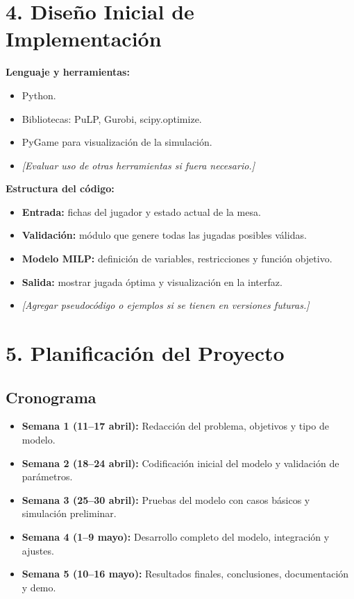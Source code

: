 \documentclass[12pt]{article}
\begin{document}
\section*{4. Diseño Inicial de Implementación}

\textbf{Lenguaje y herramientas:}
\begin{itemize}
    \item Python.
    \item Bibliotecas: PuLP, Gurobi, scipy.optimize.
    \item PyGame para visualización de la simulación.
    \item \textit{[Evaluar uso de otras herramientas si fuera necesario.]}
\end{itemize}

\textbf{Estructura del código:}
\begin{itemize}
    \item \textbf{Entrada:} fichas del jugador y estado actual de la mesa.
    \item \textbf{Validación:} módulo que genere todas las jugadas posibles válidas.
    \item \textbf{Modelo MILP:} definición de variables, restricciones y función objetivo.
    \item \textbf{Salida:} mostrar jugada óptima y visualización en la interfaz.
    \item \textit{[Agregar pseudocódigo o ejemplos si se tienen en versiones futuras.]}
\end{itemize}

\section*{5. Planificación del Proyecto}

\subsection*{Cronograma}
\begin{itemize}
    \item \textbf{Semana 1 (11–17 abril):} Redacción del problema, objetivos y tipo de modelo.
    \item \textbf{Semana 2 (18–24 abril):} Codificación inicial del modelo y validación de parámetros.
    \item \textbf{Semana 3 (25–30 abril):} Pruebas del modelo con casos básicos y simulación preliminar.
    \item \textbf{Semana 4 (1–9 mayo):} Desarrollo completo del modelo, integración y ajustes.
    \item \textbf{Semana 5 (10–16 mayo):} Resultados finales, conclusiones, documentación y demo.
\end{itemize}
\end{document}

